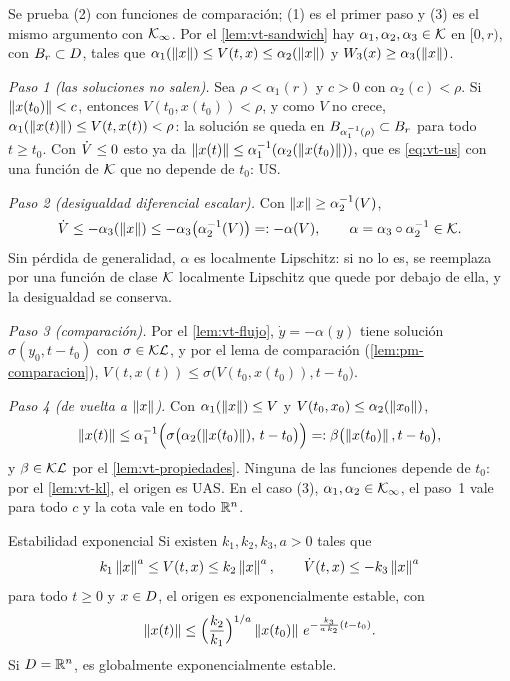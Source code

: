 \begin{demostracion}
Se prueba (2) con funciones de comparación; (1) es el primer paso y (3) es el mismo argumento con $\mathcal{K}_{\infty}$. Por el \cref{lem:vt-sandwich} hay $\alpha_1,\alpha_2,\alpha_3\in\mathcal{K}$ en $[0,r)$, con $B_{r}\subset D$, tales que $\alpha_1(\left\lVert x\right\rVert)\le V(t,x)\le\alpha_2(\left\lVert x\right\rVert)$ y $W_3(x)\ge\alpha_3(\left\lVert x\right\rVert)$.

\emph{Paso 1 (las soluciones no salen).} Sea $\rho<\alpha_1(r)$ y $c>0$ con $\alpha_2(c)<\rho$. Si $\left\lVert x(t_0)\right\rVert<c$, entonces $V(t_0,x(t_0))<\rho$, y como $V$ no crece, $\alpha_1(\left\lVert x(t)\right\rVert)\le V(t,x(t))<\rho$: la solución se queda en $B_{\alpha_1^{-1}(\rho)}\subset B_{r}$ para todo $t\ge t_0$. Con $\dot V\le0$ esto ya da $\left\lVert x(t)\right\rVert\le\alpha_1^{-1}(\alpha_2(\left\lVert x(t_0)\right\rVert))$, que es \eqref{eq:vt-us} con una función de $\mathcal{K}$ que no depende de $t_0$: US.

\emph{Paso 2 (desigualdad diferencial escalar).} Con $\left\lVert x\right\rVert\ge\alpha_2^{-1}(V)$,
\[
  \dot V\le-\alpha_3(\left\lVert x\right\rVert)\le-\alpha_3\bigl(\alpha_2^{-1}(V)\bigr)=:-\alpha(V) ,\qquad\alpha=\alpha_3\circ\alpha_2^{-1}\in\mathcal{K} .
\]
Sin pérdida de generalidad, $\alpha$ es localmente Lipschitz: si no lo es, se reemplaza por una función de clase $\mathcal{K}$ localmente Lipschitz que quede por debajo de ella, y la desigualdad se conserva.

\emph{Paso 3 (comparación).} Por el \cref{lem:vt-flujo}, $\dot y=-\alpha(y)$ tiene solución $\sigma(y_0,t-t_0)$ con $\sigma\in\mathcal{KL}$, y por el lema de comparación (\cref{lem:pm-comparacion}), $V(t,x(t))\le\sigma\bigl(V(t_0,x(t_0)),t-t_0\bigr)$.

\emph{Paso 4 (de vuelta a $\left\lVert x\right\rVert$).} Con $\alpha_1(\left\lVert x\right\rVert)\le V$ y $V(t_0,x_0)\le\alpha_2(\left\lVert x_0\right\rVert)$,
\[
  \left\lVert x(t)\right\rVert\le\alpha_1^{-1}\Bigl(\sigma\bigl(\alpha_2(\left\lVert x(t_0)\right\rVert),\,t-t_0\bigr)\Bigr)=:\beta\bigl(\left\lVert x(t_0)\right\rVert,t-t_0\bigr) ,
\]
y $\beta\in\mathcal{KL}$ por el \cref{lem:vt-propiedades}. Ninguna de las funciones depende de $t_0$: por el \cref{lem:vt-kl}, el origen es UAS. En el caso (3), $\alpha_1,\alpha_2\in\mathcal{K}_{\infty}$, el paso~1 vale para todo $c$ y la cota vale en todo $\mathbb{R}^n$.
\end{demostracion}


\begin{teorema}[label=thm:vt-exp]{Estabilidad exponencial \citep[Teo.~4.10]{Kha02}}
Si existen $k_1,k_2,k_3,a>0$ tales que
\[
  k_1\left\lVert x\right\rVert^a\le V(t,x)\le k_2\left\lVert x\right\rVert^a ,\qquad\dot V(t,x)\le-k_3\left\lVert x\right\rVert^a
\]
para todo $t\ge0$ y $x\in D$, el origen es exponencialmente estable, con
\begin{equation}
  \left\lVert x(t)\right\rVert\le\Bigl(\frac{k_2}{k_1}\Bigr)^{1/a}\left\lVert x(t_0)\right\rVert\,e^{-\frac{k_3}{a\,k_2}(t-t_0)} .
  \label{eq:vt-cotaexp}
\end{equation}
Si $D=\mathbb{R}^n$, es globalmente exponencialmente estable.
\end{teorema}

